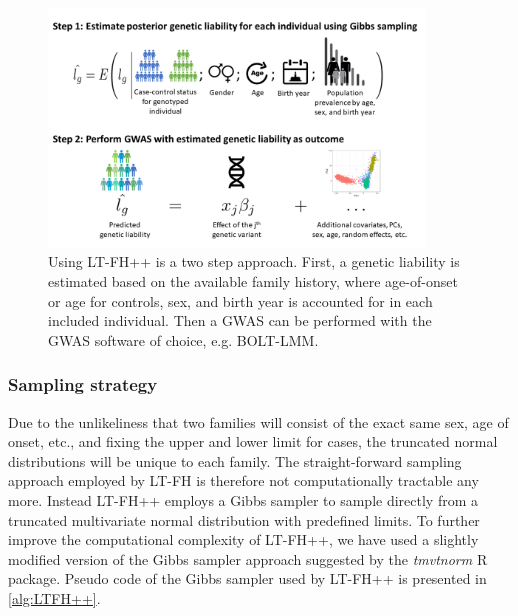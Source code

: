\begin{figure}
	\includegraphics[width=10cm]{methods/ltfhpp_steps.png}
	\caption[Overview of LT-FH++ and what information it can account for in GWAS]{
		Using LT-FH++ is a two step approach. First, a genetic liability is estimated based on the available family history, where age-of-onset or age for controls, sex, and birth year is accounted for in each included individual. Then a GWAS can be performed with the GWAS software of choice, e.g. BOLT-LMM.
	} %
	\label{fig:LTFHppFigure1}
\end{figure}

\subsubsection{Sampling strategy}

Due to the unlikeliness that two families will consist of the exact same sex, age of onset, etc., and fixing the upper and lower limit for cases, the truncated normal distributions will be unique to each family. The straight-forward sampling approach employed by LT-FH is therefore not computationally tractable any more. Instead LT-FH++ employs a Gibbs sampler to sample directly from a truncated multivariate normal distribution with predefined limits. To further improve the computational complexity of LT-FH++, we have used a slightly modified version of the Gibbs sampler approach suggested by the \textit{tmvtnorm} R package\cite{wilhelm2015gibbs,wilhelm2010tmvtnorm}. Pseudo code of the Gibbs sampler used by LT-FH++ is presented in \cref{alg:LTFH++}.


